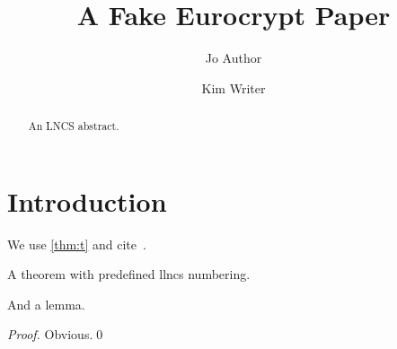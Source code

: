 \documentclass[runningheads]{llncs}
\begin{document}
\title{A Fake Eurocrypt Paper}
\author{Jo Author \and Kim Writer}
\maketitle
\begin{abstract}
An LNCS abstract.
\end{abstract}
\section{Introduction}
We use \cref{thm:t} and cite~\cite{LncsA,LncsB}.
\begin{theorem}\label{thm:t}
A theorem with predefined llncs numbering.
\end{theorem}
\begin{lemma}\label{lem:l}
And a lemma.
\end{lemma}
\begin{proof}
Obvious.\qed
\end{proof}


\end{document}
